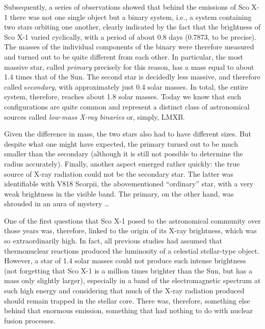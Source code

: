 Subsequently, a series of observations showed that behind the emissions of Sco
X-1 there was not one single object but a binary system, i.e., a
system containing two stars orbiting one another, clearly indicated by the fact that the
brightness of Sco X-1 varied cyclically, with a period of about 0.8
days (0.7873, to be precise). The masses of the individual components of the binary were
therefore measured and turned out to be quite different from each other. In particular,
the most massive star, called \emph{primary} precisely for this reason, has a mass equal
to about 1.4 times that of the Sun. The second star is decidedly less massive, and
therefore called s\emph{econdary}, with approximately just 0.4 solar masses. In total,
the entire system, therefore, reaches about 1.8 solar masses. Today we know that such
configurations are quite common and represent a distinct class of astronomical sources
called \emph{low-mass X-ray} \emph{binaries} or, simply,
LMXB.

Given the difference in mass, the two stars also had to have different sizes. But
despite what one might have expected, the primary turned out to be much smaller than the
secondary (although it is still not possible to determine the radius accurately).
Finally, another aspect emerged rather quickly: the true source of
X-ray radiation could not be the secondary star. The latter was
identifiable with V818 Scorpii, the abovementioned ``ordinary'' star, with a very weak
brightness in the visible band. The primary, on the other hand, was shrouded in an aura
of mystery \ldots{}

One of the first questions that Sco X-1 posed to the astronomical
community over those years was, therefore, linked to the origin of its
X-ray brightness, which was so extraordinarily high. In fact, all
previous studies had assumed that thermonuclear reactions produced the luminosity of a
celestial stellar-type object. However, a star of 1.4 solar masses could not produce
such intense brightness (not forgetting that Sco X-1 is a million
times brighter than the Sun, but has a mass only slightly larger), especially in a band
of the electromagnetic spectrum at such high energy and considering that much of the
X-ray radiation produced should remain trapped in the stellar core.
There was, therefore, something else behind that enormous emission, something that had
nothing to do with nuclear fusion processes.

